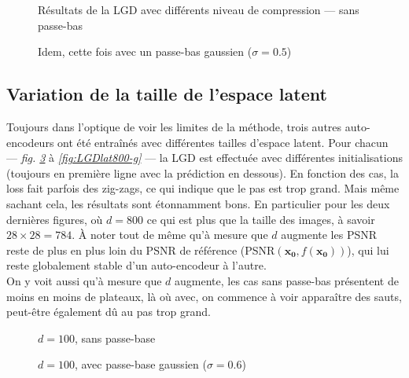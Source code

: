 \documentclass[hidelinks, french]{article} %
\renewcommand{\bf}[1]{\boldsymbol{#1}}
\theoremstyle{enonce}
\theoremstyle{special}
\theoremstyle{rq}
\theoremstyle{exo}
\theoremstyle{demo}
\begin{document}
\begin{figure}[H]\centering
	
	\caption{Résultats de la LGD avec différents niveau de compression --- sans passe-bas}
	\label{fig:LGDsizes-s}
\end{figure}

\begin{figure}[H]\centering
	
	\caption{Idem, cette fois avec un passe-bas gaussien ($\sigma=0.5$)}
	\label{fig:LGDsizes-g}
\end{figure}


\vfill



\subsection{Variation de la taille de l'espace latent}\label{sec:LGDlat}

Toujours dans l'optique de voir les limites de la méthode, trois autres auto-encodeurs ont été entraînés avec différentes tailles d'espace latent. Pour chacun --- \textit{fig. \ref{fig:LGDlat100-s}} à \textit{ \ref{fig:LGDlat800-g}} --- la LGD est effectuée avec différentes initialisations (toujours en première ligne avec la prédiction en dessous). En fonction des cas, la loss fait parfois des zig-zags, ce qui indique que le pas est trop grand. Mais même sachant cela, les résultats sont étonnamment bons. En particulier pour les deux dernières figures, où $d=800$ ce qui est plus que la taille des images, à savoir $28\times28=784$. \`A noter tout de même qu'à mesure que $d$ augmente les PSNR reste de plus en plus loin du PSNR de référence (PSNR$(\bf{x_0}, f(\bf{x_0}))$), qui lui reste globalement stable d'un auto-encodeur à l'autre.
\\
On y voit aussi qu'à mesure que $d$ augmente, les cas sans passe-bas présentent de moins en moins de plateaux, là où avec, on commence à voir apparaître des sauts, peut-être également dû au pas trop grand.

\vfill

\newpage

\begin{figure}[H]\centering
	
	\caption{$d=100$, sans passe-base}
	\label{fig:LGDlat100-s}
\end{figure}

\begin{figure}[H]\centering
	
	\caption{$d=100$, avec passe-base gaussien ($\sigma=0.6$)}
	\label{fig:LGDlat100-g}
\end{figure}
\end{document}
